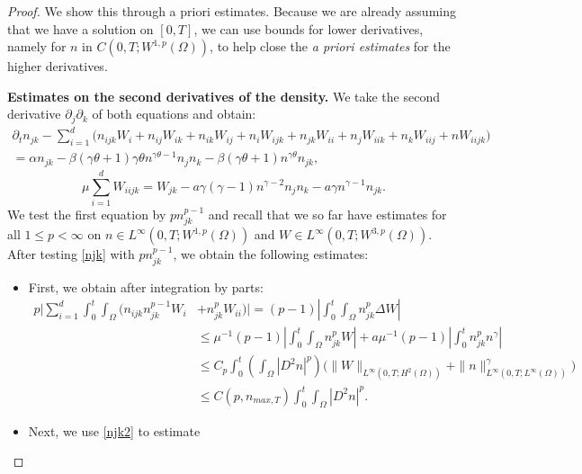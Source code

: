 \documentclass[10pt,a4paper]{amsart}
\begin{document}
\begin{proof}

We show this through a priori estimates. Because we are already assuming that we have a solution on $[0, T]$, we can use bounds for lower derivatives, namely for $n$ in $C(0, T; W^{1, p}(\Omega))$, to help close the \textit{a priori estimates} for the higher derivatives.

\medskip

\noindent \textbf{Estimates on the second derivatives of the density.} We take the second derivative $\partial_{j} \partial_{k}$ of both equations and obtain:
\begin{multline}\label{njk}
\partial_{t} n_{jk} - \sum_{i = 1}^{d} \Big(n_{ijk}W_{i} + n_{ij}W_{ik} + n_{ik}W_{ij} + n_{i}W_{ijk} + n_{jk}W_{ii} + n_{j}W_{iik} + n_{k}W_{iij} + nW_{iijk}\Big) \\
= \alpha n_{jk} - \beta(\gamma \theta + 1) \gamma \theta n^{\gamma \theta - 1} n_{j}n_{k} - \beta(\gamma \theta + 1) n^{\gamma \theta} n_{jk},
\end{multline}
\begin{equation}\label{njk2}
\mu \sum_{i = 1}^{d} W_{iijk} = W_{jk} - a\gamma(\gamma - 1)n^{\gamma - 2} n_{j}n_{k} - a\gamma n^{\gamma - 1} n_{jk}.
\end{equation}
We test the first equation by $p n_{jk}^{p - 1}$ and recall that we so far have estimates for all $1 \le p < \infty$ on $n \in L^{\infty}(0, T; W^{1, p}(\Omega))$ and $W \in L^{\infty}(0, T; W^{3, p}(\Omega))$. After testing \eqref{njk} with $p n_{jk}^{p - 1}$, we obtain the following estimates:
\begin{itemize}
    \item First, we obtain after integration by parts:
    \begin{align*}
    p\Big|\sum_{i = 1}^{d} \int_{0}^{t} \int_{\Omega} \Big(n_{ijk}n_{jk}^{p - 1}W_{i} &+ n_{jk}^{p}W_{ii}\Big)\Big| = (p - 1) \left|\int_{0}^{t} \int_{\Omega} n_{jk}^{p} \Delta W\right| \\
    &\le \mu^{-1}(p - 1) \left|\int_{0}^{t} \int_{\Omega} n_{jk}^{p}W\right| + a\mu^{-1}(p - 1) \left|\int_{0}^{t} n_{jk}^{p}n^{\gamma}\right| \\
    &\le C_{p}\int_{0}^{t} \left(\int_{\Omega} |D^{2}n|^{p}\right) \Big(\|W\|_{L^{\infty}(0, T; H^{2}(\Omega))} + \|n\|_{L^{\infty}(0, T; L^{\infty}(\Omega))}^{\gamma}\Big) \\
    &\le C(p, n_{max, T}) \int_{0}^{t} \int_{\Omega} |D^{2}n|^{p}.
    \end{align*}
    \item Next, we use \eqref{njk2} to estimate

\end{itemize}
\end{proof}
\end{document}
